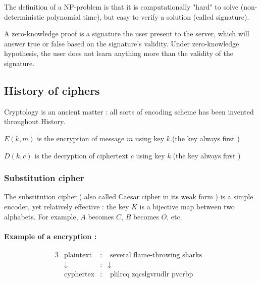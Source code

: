 The definition of a NP-problem is that it is computationally "hard" to solve (non-deterministic polynomial time), but easy to verify a solution (called signature).

A zero-knowledge proof is a signature the user present to the server, which will answer true or false based on the signature's validity. Under zero-knowledge hypothesis, the user does not learn anything more than the validity of the signature.

\subsection{History of ciphers}

Cryptology is an ancient matter : all sorts of encoding scheme has been invented throughout History. 

\begin{mydef}
	$E(k,m)$ is the encryption of message $m$ using key $k$.(the key always first ) 
\end{mydef}
\begin{mydef}
	$D(k,c)$ is the decryption of ciphertext $c$ using key $k$.(the key always first ) 
\end{mydef}

\subsubsection{Substitution cipher }
The substitution cipher ( also called Caesar cipher in its weak form ) is a simple encoder, yet relatively effective : the key $K$ is a bijective map between two alphabets. For example, $A$ becomes $C$, $B$ becomes $O$, etc.\\

\begin{table}[h!]
    \centering
	\caption{Exemple of a substitution table}
	\label{tab:SubstitionTable}
\end{table}

\paragraph{Example of a encryption : }
\begin{alignat*}{3}
    &\text{plaintext}   & : & \text{ several flame-throwing sharks}&  \\
    & \downarrow        & : &   \downarrow & \\
    &\text{cyphertex}   & : & \text{ plilrcq   zqcslgvrudlr pvcrbp}&  \\ 
\end{alignat*}


